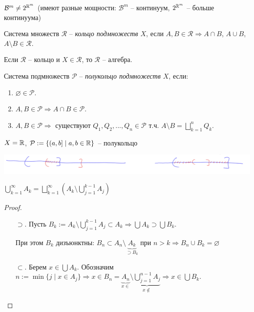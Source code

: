 \begin{remark}
    $\mathcal{B}^m\not = 2^{\mathbb{R}^m}$ (имеют разные мощности: $\mathcal{B}^m$ – континуум, $2^{\mathbb{R}^m}$ – больше континуума)
\end{remark}

\begin{definition}
    Система множеств $\mathcal{R}$ – \textit{кольцо подмножеств $X$}, если $A, B\in \mathcal{R}\Rightarrow A \cap B$, $A \cup B$, $A \setminus B\in \mathcal{R}$.
\end{definition}

\begin{remark}
    Если $\mathcal{R}$ – кольцо и $X\in \mathcal{R}$, то $\mathcal{R}$ – алгебра.
\end{remark}

\begin{definition}
    Система подмножеств $\mathcal{P}$ – \textit{полукольцо подмножеств $X$}, если:
    \begin{enumerate}
        \item $\varnothing \in \mathcal{P}$.
        \item $A, B \in \mathcal{P}\Rightarrow A \cap B \in \mathcal{P}$.
        \item $A, B \in \mathcal{P}\Rightarrow$ существуют $Q_1, Q_2, ..., Q_n\in \mathcal{P}$ 
            т.ч. $A\setminus B =\bigsqcup\limits_{k=1}^n Q_k$.
    \end{enumerate}
\end{definition}

\begin{example}
    $X=\mathbb{R}$, $\mathcal{P}:=\{ (a, b] \mid a, b\in \mathbb{R}\}$ – полукольцо

    \includegraphics[width=0.7\linewidth]{images/23-09-07-3.png}
\end{example}

\begin{lemma}
    $\bigcup\limits_{k=1}^\infty A_k=\bigsqcup\limits_{k=1}^\infty (A_k \setminus \bigcup\limits_{j=1}^{k - 1} A_j)$ 
\end{lemma}

\begin{proof}~
    \begin{enumerate}
        \item[$\supset$.] Пусть $B_k := A_k \setminus \bigcup\limits_{j=1}^{k-1} A_j \subset A_k \Rightarrow \bigcup A_k \supset \bigcup B_k$.
        
        При этом $B_k$ дизъюнктны: $B_n \subset A_n \setminus \underbrace{A_k}_{\supset B_k}$ при $n>k\Rightarrow B_n \cup B_k = \varnothing$
        
        \item[$\subset$.] Берем $x\in \bigcup A_k$. Обозначим $n:=\min \{j\mid x\in A_j\}\Rightarrow x\in B_n=\underbrace{A_n}_{x\in}\setminus \underbrace{\bigcup\limits_{j=1}^{n-1} A_j}_{x\not\in} 
        \Rightarrow x\in \bigcup B_k$.    
    \end{enumerate} 
\end{proof}

